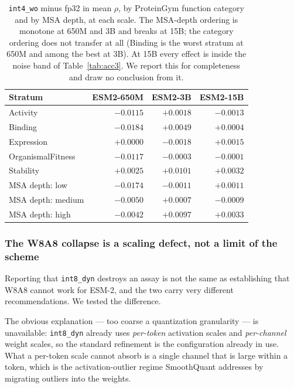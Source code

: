 \documentclass[11pt]{article}
\newcommand{\cfg}[1]{\texttt{#1}}
\begin{document}
\begin{table}[htb]
\centering
\caption{\cfg{int4\_wo} minus fp32 in mean $\rho$, by ProteinGym function
category and by MSA depth, at each scale. The MSA-depth ordering is monotone at
650M and 3B and breaks at 15B; the category ordering does not transfer at all
(Binding is the worst stratum at 650M and among the best at 3B). At 15B every
effect is inside the noise band of Table~\ref{tab:acc3}. We report this for
completeness and draw no conclusion from it.}
\label{tab:strata}
\small
\begin{tabular}{lrrr}
\toprule
Stratum & ESM2-650M & ESM2-3B & ESM2-15B \\
\midrule
Activity            & $-0.0115$ & $+0.0018$ & $-0.0013$ \\
Binding             & $-0.0184$ & $+0.0049$ & $+0.0004$ \\
Expression          & $+0.0000$ & $-0.0018$ & $+0.0015$ \\
OrganismalFitness   & $-0.0117$ & $-0.0003$ & $-0.0001$ \\
Stability           & $+0.0025$ & $+0.0101$ & $+0.0032$ \\
\addlinespace
MSA depth: low      & $-0.0174$ & $-0.0011$ & $+0.0011$ \\
MSA depth: medium   & $-0.0050$ & $+0.0007$ & $-0.0009$ \\
MSA depth: high     & $-0.0042$ & $+0.0097$ & $+0.0033$ \\
\bottomrule
\end{tabular}
\end{table}

\subsubsection{The W8A8 collapse is a scaling defect, not a limit of the scheme}
\label{sec:w8a8fix}

Reporting that \cfg{int8\_dyn} destroys an assay is not the same as establishing
that W8A8 cannot work for ESM-2, and the two carry very different
recommendations. We tested the difference.

The obvious explanation --- too coarse a quantization granularity --- is
unavailable: \cfg{int8\_dyn} already uses \emph{per-token} activation scales and
\emph{per-channel} weight scales, so the standard refinement is the
configuration already in use. What a per-token scale cannot absorb is a single
channel that is large within a token, which is the activation-outlier regime
SmoothQuant addresses by migrating outliers into the weights.
\end{document}
